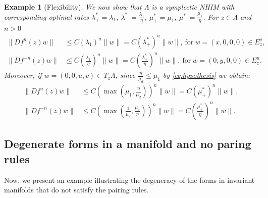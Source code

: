 \documentclass[11pt]{amsart}
\newtheorem{ex}[thm]{Example}
\theoremstyle{definition}
\theoremstyle{remark}
\numberwithin{equation}{section}
\begin{document}
\begin{ex}[Flexibility]
We now show  that  $\Lambda$ is a  symplectic  NHIM with corresponding optimal rates   $\lambda_+^*=\lambda_1$, $\lambda_-^*=\frac{\lambda_1}{\eta}$, $\mu_+^*=\mu_1$, $\mu_-^*=\frac{\mu_1}{\eta}$. For  $z\in \Lambda$ and $n>0$
\[
\begin{split}
\|Df^n(z)w\| & \le C(\lambda_1)^n \|w\|= C(\lambda_+^*)^n \|w\|, \ \text{for} \ w=(x,0,0,0) \in E^s_z ,\\
\|Df^{-n}(z)w\| & \le C(\frac{\lambda_1}{\eta})^n \|w\|= C(\frac{\lambda_+^*}{\eta})^n \|w\|, \ \text{for} \ w=(0,y,0,0) \in E^u_z .
\end{split}
\]
Moreover, if $w=(0,0,u,v) \in T_z\Lambda$, since $\frac{\eta}{\mu_d}\le\mu_1$ by \eqref{eq:hypothesis} we obtain:
\[
\begin{split}
\|Df^{n}(z)w\| & \le C\left(\max{\left(\mu_1, \frac{\eta}{\mu_d}\right)}\right)^n \|w\|=
C(\mu_+^*)^n \|w\|, \\
\|Df^{-n}(z)w\|  & \le C\left(\max{\left(\frac{1}{\mu_d}, \frac{\mu_1}{\eta}\right)}\right)^n \|w\|
= C\left(\frac{\mu_+^*}{\eta}\right)^n \|w\|.
\end{split}
\]
\end{ex}



\subsection{ Degenerate forms in a manifold and no paring rules}

Now, we present an example illustrating the degeneracy of the forms in invariant manifolds that do
not satisfy the pairing rules.
\end{document}

